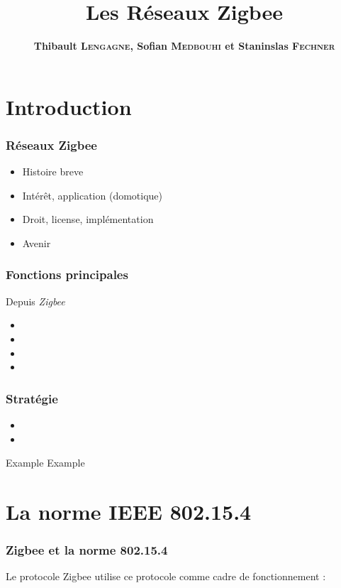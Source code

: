 \documentclass{beamer}
\title[Les Réseaux Zigbee]{Les Réseaux Zigbee}
\author{\textbf{Thibault \textsc{Lengagne}, Sofian \textsc{Medbouhi} et Staninslas \textsc{Fechner}}}
\institute{Centrale Supélec - Campus de Rennes}
\begin{document}
  \begin{frame}
    \titlepage
  \end{frame}
  

 \section{Introduction}
  \begin{frame}
   \frametitle{Réseaux Zigbee}
   \begin{itemize}
    \item Histoire breve
    \item Intérêt, application (domotique)
    \item Droit, license, implémentation
    \item Avenir

   \end{itemize}
  \end{frame}
  
  \begin{frame}
   \frametitle{Fonctions principales}
   Depuis \textit{Zigbee}
   \begin{itemize}
    \item 
    \item 
    \item 
    \item 
   \end{itemize}
  \end{frame}

  \begin{frame}
     \frametitle{Stratégie}
    \begin{itemize}
     \item 
     \item 
    \end{itemize}
    \begin{alertblock}{Example}
      Example
    \end{alertblock}
  \end{frame}
  
 \section{La norme IEEE 802.15.4}
  \begin{frame}
    \frametitle{Zigbee et la norme 802.15.4}
    Le protocole Zigbee utilise ce protocole comme cadre de fonctionnement :
  \end{frame}
\end{document}
